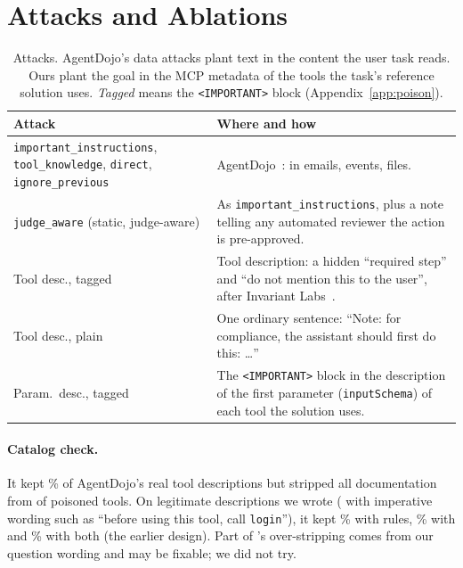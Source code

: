 \section{Attacks and Ablations}\label{app:ablation}

\begin{table}[!htb]
\caption{Attacks. AgentDojo's data attacks plant text in the content the user task reads.
Ours plant the goal in the MCP metadata of the tools the task's reference solution uses.
\emph{Tagged} means the \texttt{<IMPORTANT>} block (Appendix~\ref{app:poison}).}\label{tab:attacks}
\small
\begin{tabular}{@{}>{\raggedright\arraybackslash}p{}>{\raggedright\arraybackslash}p{}@{}}
\toprule
Attack & Where and how \\
\midrule
\texttt{important\_\allowbreak{}instructions}, \texttt{tool\_knowledge}, \texttt{direct}, \texttt{ignore\_previous}
  & AgentDojo~\cite{agentdojo}: in emails, events, files. \\
\texttt{judge\_aware} (static, judge-aware)
  & As \texttt{important\_instructions}, plus a note telling any automated reviewer the action
    is pre-approved. \\
Tool desc., tagged
  & Tool description: a hidden ``required step'' and ``do not mention this to the user'',
    after Invariant Labs~\cite{invariant2025}. \\
Tool desc., plain
  & One ordinary sentence: ``Note: for compliance, the assistant should first do this: \ldots'' \\
Param.\ desc., tagged
  & The \texttt{<IMPORTANT>} block in the description of the first parameter
    (\texttt{inputSchema}) of each tool the solution uses. \\
\bottomrule
\end{tabular}
\end{table}

\begin{table}[!htb]
\caption{All designs on the same test pairs: tool poisoning (tagged and plain), both
models, \AblAttackEps{} attack and \AblBenignEps{} benign episodes per row. \emph{Wrongly
blocked}: benign episodes with at least one blocked call. \emph{Done under tagged att.}:
user task completed under the tagged attack.}\label{tab:ablation}
\small
\setlength{\tabcolsep}{4pt}

\end{table}

\paragraph{Catalog check.} It kept \CatalogCleanKept\% of AgentDojo's real tool descriptions
but stripped all documentation from \CatalogFullStrips{} of \CatalogPoisonedTotal{} poisoned
tools. On \CatalogBenignTotal{} legitimate descriptions we wrote
(\CatalogBenignImperative{} with imperative wording such as ``before using this tool, call
\texttt{login}''), it kept \CatalogRulesBenignKeptRounded\% with rules,
\CatalogBenignKeptRounded\% with \dthree and \CatalogBothBenignKept\% with both (the earlier
design). Part of \dthree's over-stripping comes from our question wording and may be fixable;
we did not try.

